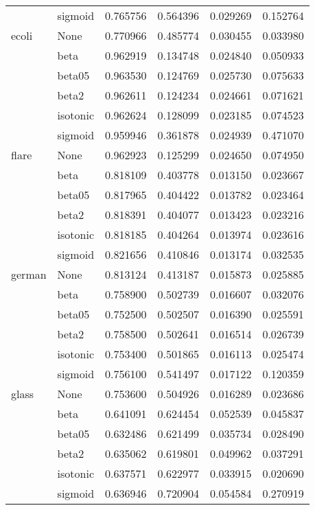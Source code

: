 \begin{tabular}{llrrrr}
        & sigmoid &  0.765756 &  0.564396 &  0.029269 &  0.152764 \\
ecoli & None &  0.770966 &  0.485774 &  0.030455 &  0.033980 \\
        & beta &  0.962919 &  0.134748 &  0.024840 &  0.050933 \\
        & beta05 &  0.963530 &  0.124769 &  0.025730 &  0.075633 \\
        & beta2 &  0.962611 &  0.124234 &  0.024661 &  0.071621 \\
        & isotonic &  0.962624 &  0.128099 &  0.023185 &  0.074523 \\
        & sigmoid &  0.959946 &  0.361878 &  0.024939 &  0.471070 \\
flare & None &  0.962923 &  0.125299 &  0.024650 &  0.074950 \\
        & beta &  0.818109 &  0.403778 &  0.013150 &  0.023667 \\
        & beta05 &  0.817965 &  0.404422 &  0.013782 &  0.023464 \\
        & beta2 &  0.818391 &  0.404077 &  0.013423 &  0.023216 \\
        & isotonic &  0.818185 &  0.404264 &  0.013974 &  0.023616 \\
        & sigmoid &  0.821656 &  0.410846 &  0.013174 &  0.032535 \\
german & None &  0.813124 &  0.413187 &  0.015873 &  0.025885 \\
        & beta &  0.758900 &  0.502739 &  0.016607 &  0.032076 \\
        & beta05 &  0.752500 &  0.502507 &  0.016390 &  0.025591 \\
        & beta2 &  0.758500 &  0.502641 &  0.016514 &  0.026739 \\
        & isotonic &  0.753400 &  0.501865 &  0.016113 &  0.025474 \\
        & sigmoid &  0.756100 &  0.541497 &  0.017122 &  0.120359 \\
glass & None &  0.753600 &  0.504926 &  0.016289 &  0.023686 \\
        & beta &  0.641091 &  0.624454 &  0.052539 &  0.045837 \\
        & beta05 &  0.632486 &  0.621499 &  0.035734 &  0.028490 \\
        & beta2 &  0.635062 &  0.619801 &  0.049962 &  0.037291 \\
        & isotonic &  0.637571 &  0.622977 &  0.033915 &  0.020690 \\
        & sigmoid &  0.636946 &  0.720904 &  0.054584 &  0.270919 \\

\end{tabular}
